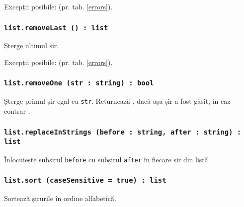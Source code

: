 Excepții posibile:  (pr. tab. \ref{errors}).

\subsubsection{\texttt{list.removeLast () : list}}

Șterge ultimul șir.

Excepții posibile:  (pr. tab. \ref{errors}).

\subsubsection{\texttt{list.removeOne (str : string) : bool}}

Șterge primul șir egal cu \texttt{str}. Returnează \true, dacă așa șir a fost găsit, în caz contrar \false.

\subsubsection{\texttt{list.replaceInStrings (before : string, after : string) : list}}

Înlocuiește subșirul \texttt{before} cu subșirul \texttt{after} în fiecare șir din listă.

\subsubsection{\texttt{list.sort (caseSensitive = true) : list}}

Sortează șirurile în ordine alfabetică.

